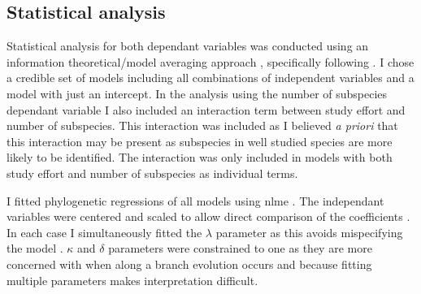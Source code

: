 


\subsection{Statistical analysis}

Statistical analysis for both dependant variables was conducted using an information theoretical/model averaging approach \cite{burnham2002model}, specifically following \textcite{whittingham2005habitat, whittingham2006we}.
I chose a credible set of models including all combinations of independent variables and a model with just an intercept.
In the analysis using the number of subspecies dependant variable I also included an interaction term between study effort and number of subspecies.
This interaction was included as I believed \emph{a priori} that this interaction may be present as subspecies in well studied species are more likely to be identified.
The interaction was only included in models with both study effort and number of subspecies as individual terms.

I fitted phylogenetic regressions of all models using nlme \cite{nlme}.
The independant variables were centered and scaled to allow direct comparison of the coefficients \cite{schielzeth2010simple}.
In each case I simultaneously fitted the $\lambda$ parameter as this avoids mispecifying the model \cite{revell2010phylogenetic}.
$\kappa$ and $\delta$ parameters were constrained to one as they are more concerned with when along a branch evolution occurs and because fitting multiple parameters makes interpretation difficult. 

